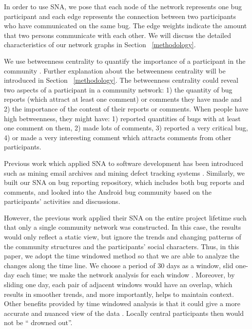 \documentclass[10pt, conference, compsocconf]{IEEEtran}
\begin{document}
In order to use SNA, we pose that each node of the network represents
one bug participant and each edge represents the connection between
two participants who have communicated on the same bug. 
The edge weights indicate the amount that two persons communicate with
each other. 
We will discuss the detailed characteristics of our network graphs in
Section ~\ref{methodology}.


We use betweenness centrality to quantify the importance of a
participant in the community \cite{ICSEsocio:la}. 
Further explanation about the betweenness centrality will be
introduced in Section ~\ref{methodology}. 
The betweenness centrality could reveal two aspects of a participant
in a community network: 1) the quantity of bug reports (which attract
at least one comment) or comments they have made and 2) the importance
of the content of their reports or comments. 
When people have high betweenness, they might have: 1) reported
quantities of bugs with at least one comment on them, 2) made lots of
comments, 3) reported a very critical bug, 4) or made a very
interesting comment which attracts comments from other participants.


Previous work which applied SNA to software development has been
introduced such as mining email archives and mining defect tracking
systems \cite{MSR:christ} \cite{ACM:ashish} \cite{OSD:yasu}. 
Similarly, we built our SNA on bug reporting repository, which
includes both bug reports and comments, and looked into the Android
bug community based on the participants' activities and discussions.


However, the previous work applied their SNA on the entire project
lifetime such that only a single community network was constructed. 
In this case, the results would only reflect a static view, but ignore
the trends and changing patterns of the community structures and the
participants' social characters. 
Thus, in this paper, we adopt the time windowed method so that we are
able to analyze the changes along the time line. 
We choose a period of 30 days as a window, slid one-day each time; we
make the network analysis for each window \cite{ICSMwindowed:hindle}. 
Moreover, by sliding one day, each pair of adjacent windows would have
an overlap, which results in smoother trends, and more importantly,
helps to maintain context. 
Other benefits provided by time windowed analysis is that it could
give a more accurate and nuanced view of the data
\cite{ICSEsocio:meneely} \cite{ICSMwindowed:hindle}. 
Locally central participants then would not be \textquotedblleft
drowned out\textquotedblright. 
\end{document}
